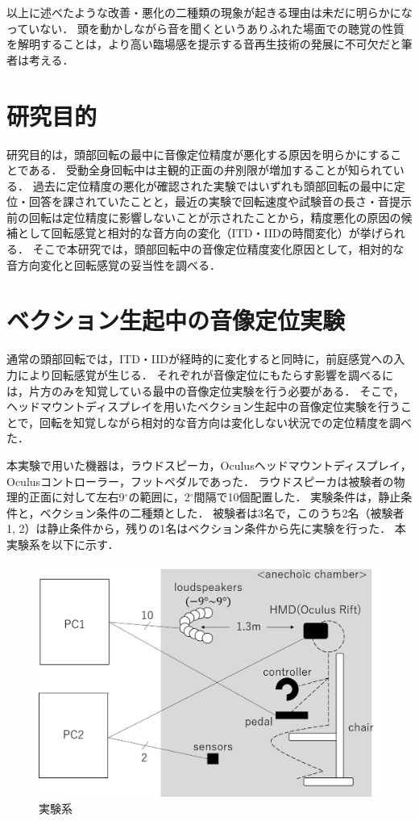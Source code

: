 \documentclass[12pt,a4j]{jsarticle}
\renewcommand{\ }{\hspace{1zw}}
\begin{document}
以上に述べたような改善・悪化の二種類の現象が起きる理由は未だに明らかになっていない．
頭を動かしながら音を聞くというありふれた場面での聴覚の性質を解明することは，より高い臨場感を提示する音再生技術の発展に不可欠だと筆者は考える．

\section{研究目的}
研究目的は，頭部回転の最中に音像定位精度が悪化する原因を明らかにすることである．
受動全身回転中は主観的正面の弁別限が増加することが知られている．
過去に定位精度の悪化が確認された実験ではいずれも頭部回転の最中に定位・回答を課されていたことと，最近の実験で回転速度や試験音の長さ・音提示前の回転は定位精度に影響しないことが示されたことから，精度悪化の原因の候補として回転感覚と相対的な音方向の変化（ITD・IIDの時間変化）が挙げられる．
そこで本研究では，頭部回転中の音像定位精度変化原因として，相対的な音方向変化と回転感覚の妥当性を調べる．

\section{ベクション生起中の音像定位実験}
通常の頭部回転では，ITD・IIDが経時的に変化すると同時に，前庭感覚への入力により回転感覚が生じる．
それぞれが音像定位にもたらす影響を調べるには，片方のみを知覚している最中の音像定位実験を行う必要がある．
そこで，ヘッドマウントディスプレイを用いたベクション生起中の音像定位実験を行うことで，回転を知覚しながら相対的な音方向は変化しない状況での定位精度を調べた．

本実験で用いた機器は，ラウドスピーカ，Oculusヘッドマウントディスプレイ，Oculusコントローラー，フットペダルであった．
ラウドスピーカは被験者の物理的正面に対して左右9$^\circ$の範囲に，2$^\circ$間隔で10個配置した．
実験条件は，静止条件と，ベクション条件の二種類とした．
被験者は3名で，このうち2名（被験者1, 2）は静止条件から，残りの1名はベクション条件から先に実験を行った．
本実験系を以下に示す．
\begin{figure}[htbp]
    \centering
    \includegraphics[width=0.8\columnwidth]{./figure/system.png}
    \caption{実験系}
    \label{system}
\end{figure}
\end{document}
